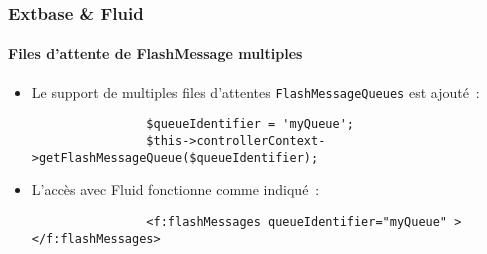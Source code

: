 \begin{frame}[fragile]
	\frametitle{Extbase \& Fluid}
	\framesubtitle{Files d'attente de FlashMessage multiples}

	\begin{itemize}

		\item Le support de multiples files d'attentes \texttt{FlashMessageQueues} est ajouté~:

			\begin{lstlisting}
				$queueIdentifier = 'myQueue';
				$this->controllerContext->getFlashMessageQueue($queueIdentifier);
			\end{lstlisting}

		\item L'accès avec Fluid fonctionne comme indiqué~:

			\begin{lstlisting}
				<f:flashMessages queueIdentifier="myQueue" ></f:flashMessages>
			\end{lstlisting}

	\end{itemize}

\end{frame}


